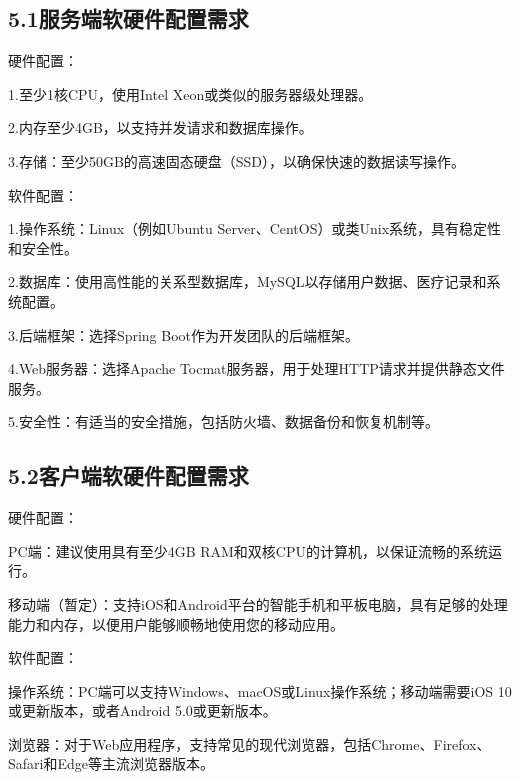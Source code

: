 \documentclass[24pt,a4paper]{article}%
\begin{document}
\subsection*{\songti 5.1服务端软硬件配置需求}
\noindent 硬件配置：\par
1.至少1核CPU，使用Intel Xeon或类似的服务器级处理器。\par
2.内存至少4GB，以支持并发请求和数据库操作。\par
3.存储：至少50GB的高速固态硬盘（SSD），以确保快速的数据读写操作。\par
\noindent  软件配置：\par
1.操作系统：Linux（例如Ubuntu Server、CentOS）或类Unix系统，具有稳定性和安全性。\par
2.数据库：使用高性能的关系型数据库，MySQL以存储用户数据、医疗记录和系统配置。\par
3.后端框架：选择Spring Boot作为开发团队的后端框架。\par
4.Web服务器：选择Apache Tocmat服务器，用于处理HTTP请求并提供静态文件服务。\par
5.安全性：有适当的安全措施，包括防火墙、数据备份和恢复机制等。
\subsection*{\songti 5.2客户端软硬件配置需求}
\noindent 硬件配置：\par
PC端：建议使用具有至少4GB RAM和双核CPU的计算机，以保证流畅的系统运行。\par
移动端（暂定）：支持iOS和Android平台的智能手机和平板电脑，具有足够的处理能力和内存，以便用户能够顺畅地使用您的移动应用。\par
\noindent 软件配置：\par
操作系统：PC端可以支持Windows、macOS或Linux操作系统；移动端需要iOS 10或更新版本，或者Android 5.0或更新版本。\par
浏览器：对于Web应用程序，支持常见的现代浏览器，包括Chrome、Firefox、Safari和Edge等主流浏览器版本。
\newpage
\end{document}
